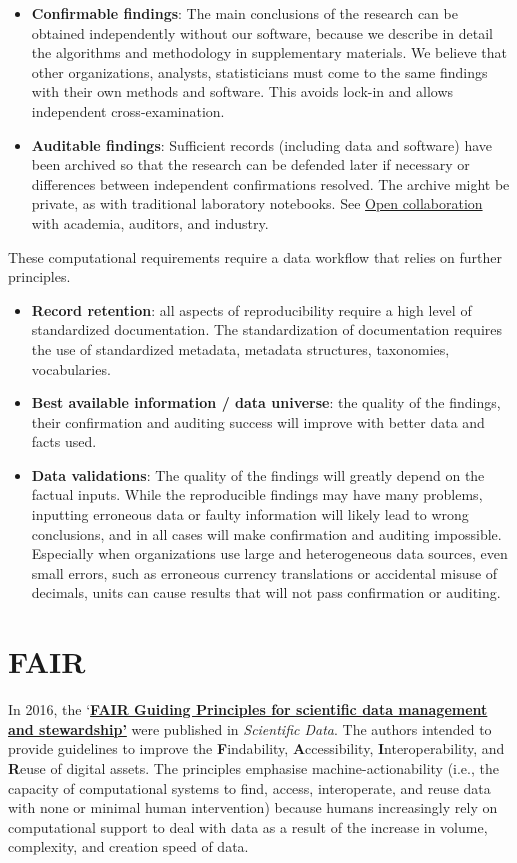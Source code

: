 \documentclass[
  a4paper,
  openany, a4paper, oneside]{book}
\begin{document}
\begin{itemize}
\item
  \textbf{Confirmable findings}: The main conclusions of the research can be obtained independently without our software, because we describe in detail the algorithms and methodology in supplementary materials. We believe that other organizations, analysts, statisticians must come to the same findings with their own methods and software. This avoids lock-in and allows independent cross-examination.
\item
  \textbf{Auditable findings}: Sufficient records (including data and software) have been archived so that the research can be defended later if necessary or differences between independent confirmations resolved. The archive might be private, as with traditional laboratory notebooks. See \protect\hyperlink{opencollaboration}{Open collaboration} with academia, auditors, and industry.
\end{itemize}

These computational requirements require a data workflow that relies on further principles.

\begin{itemize}
\item
  \textbf{Record retention}: all aspects of reproducibility require a high level of standardized documentation. The standardization of documentation requires the use of standardized metadata, metadata structures, taxonomies, vocabularies.
\item
  \textbf{Best available information / data universe}: the quality of the findings, their confirmation and auditing success will improve with better data and facts used.
\item
  \textbf{Data validations}: The quality of the findings will greatly depend on the factual inputs. While the reproducible findings may have many problems, inputting erroneous data or faulty information will likely lead to wrong conclusions, and in all cases will make confirmation and auditing impossible. Especially when organizations use large and heterogeneous data sources, even small errors, such as erroneous currency translations or accidental misuse of decimals, units can cause results that will not pass confirmation or auditing.
\end{itemize}

\hypertarget{fair}{%
\section{FAIR}\label{fair}}

In 2016, the `\textbf{\href{http://www.nature.com/articles/sdata201618}{FAIR Guiding Principles for scientific data management and stewardship'}} were published in \emph{Scientific Data}. The authors intended to provide guidelines to improve the \textbf{F}indability, \textbf{A}ccessibility, \textbf{I}nteroperability, and \textbf{R}euse of digital assets. The principles emphasise machine-actionability (i.e., the capacity of computational systems to find, access, interoperate, and reuse data with none or minimal human intervention) because humans increasingly rely on computational support to deal with data as a result of the increase in volume, complexity, and creation speed of data.
\end{document}
